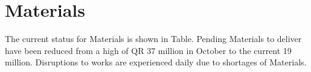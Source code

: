 \chapter{Materials}

The current status for Materials is shown in Table. Pending Materials to deliver have been reduced from a high of QR 37 million in October to the current 19 million. Disruptions to works are experienced daily due to shortages of Materials.

